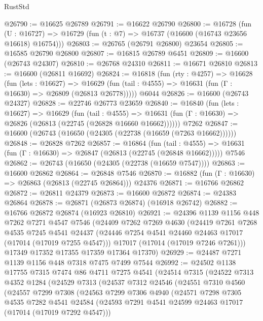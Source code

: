\begin{lexlean}{RustStd}
\begin{coremodule}
@26790 := @16625 @26789
@26791 := @16622 @26790
@26800 := @16728
    (fun (U : @16727) => @16729 (fun (t : @7) => @16737 (@16600 (@16743 @23656 @16618) @16754)))
@26803 := @26765 (@26791 @26800) @23654
@26805 := @16585 @26790 @26800
@26807 := @16815 @26789 @6451
@26809 := @16600 (@26743 @24307)
@26810 := @26768 @24310
@26811 := @16671 @26810
@26813 := @16600 (@26811 @16692)
@26824 := @16818
    (fun (rty : @4257) =>
    @16628
      (fun (lets : @16627) =>
      @16629 (fun (tail : @4555) => @16631 (fun (Γ : @16630) => @26809 (@26813 @26778)))))
    @6044
@26826 := @16600 (@26743 @24327)
@26828 := @22746 @26773 @23659
@26840 := @16840
    (fun (lets : @16627) =>
    @16629
      (fun (tail : @4555) =>
      @16631 (fun (Γ : @16630) => @26826 (@26813 (@22745 (@26828 @16660 @16662))))))
    @7262
@26847 := @16600 (@26743 (@16650 (@24305 (@22738 (@16659 (@7263 @16662))))))
@26848 := @26828 @7262
@26857 := @16864
    (fun (tail : @4555) => @16631 (fun (Γ : @16630) => @26847 (@26813 (@22745 (@26848 @16662)))))
    @7546
@26862 := @26743 (@16650 (@24305 (@22738 (@16659 @7547))))
@26863 := @16600 @26862
@26864 := @26848 @7546
@26870 := @16882 (fun (Γ : @16630) => @26863 (@26813 (@22745 @26864))) @24376
@26871 := @16766 @26862
@26872 := @26811 @24379
@26873 := @16600 @26872
@26874 := @24383 @26864
@26878 := @26871 (@26873 @26874) (@16918 @26742)
@26882 := @16766 @26872 @26874 (@16923 @26810)
@26921 := @24396
    @1139
    @1156
    @448
    @7262
    @7271
    @4547
    @7546
    (@24409
      @7262
      @7269
      @4630
      (@24419
        @7261
        @7268
        @4535
        @7245
        @4541
        @24437
        (@24446 @7254 @4541 @24460 @24463 @17017 (@17014 (@17019 @7255 @4547)))
        @17017
        (@17014 (@17019 @7246 @7261)))
      @17349
      @17352
      @17355
      @17359
      @17364
      @17370)
@26929 := @24487 @7271 @1139 @1156 @448 @7318 @7475 @7499 @7544
@26992 := @24502
    @1138
    @17755
    @7315
    @7474
    @86
    @4711
    @7275
    @4541
    (@24514
      @7315
      (@24522
        @7313
        @4352
        @1284
        (@24529
          @7313
          (@24537
            @7312
            @24546
            (@24551
              @7310
              @4560
              (@24557
                @7299
                @7308
                (@24563
                  @7299
                  @7306
                  @4940
                  (@24571
                    @7298
                    @7305
                    @4535
                    @7282
                    @4541
                    @24584
                    (@24593 @7291 @4541 @24599 @24463 @17017 (@17014 (@17019 @7292 @4547)))

\end{coremodule}
\end{lexlean}
